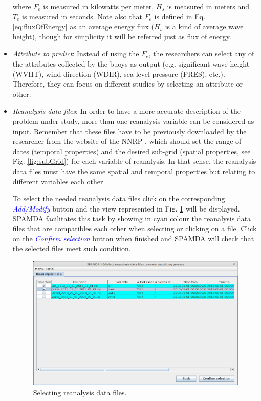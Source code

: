 \begin{onehalfspace}
\begin{itemize}
					where $F_e$ is measured in kilowatts per meter, $H_s$ is measured in meters and $T_e$ is measured in seconds. Note also that $F_e$ is defined in Eq. \ref{eq:fluxOfEnergy} as an average energy flux ($H_s$ is a kind of average wave height), though for simplicity it will be referred just as flux of energy.
					
					\item \textit{Attribute to predict}: Instead of using the $F_e$, the researchers can select any of the attributes collected by the buoys as output (e.g. significant wave height (WVHT), wind direction (WDIR), sea level pressure (PRES), etc.). Therefore, they can focus on different studies by selecting an attribute or other.

					\item \textit{Reanalysis data files}: In order to have a more accurate description of the problem under study, more than one reanalysis variable can be considered as input. Remember that these files have to be previously downloaded by the researcher from the website of the NNRP \cite{NNRP}, which should set the range of dates (temporal properties) and the desired sub-grid (spatial properties, see Fig. \ref{fig:subGrid}) for each variable of reanalysis. In that sense, the reanalysis data files must have the same spatial and temporal properties but relating to different variables each other.
					
					To select the needed reanalysis data files click on the corresponding \textcolor{blue}{\textit{Add/Modify}} button and the view represented in Fig. \ref{fig:selectingReanalysisDataFiles} will be displayed. SPAMDA facilitates this task by showing in cyan colour the reanalysis data files that are compatibles each other when selecting or clicking on a file. Click on the \textcolor{blue}{\textit{Confirm selection}} button when finished and SPAMDA will check that the selected files meet such condition.
					
					\begin{figure}[ht!]
						\centering
						\includegraphics[scale=0.40]{figures/selectingReanalysisDataFiles.png}
						\caption{Selecting reanalysis data files.}
						\label{fig:selectingReanalysisDataFiles}
					\end{figure}


\end{itemize}
\end{onehalfspace}
